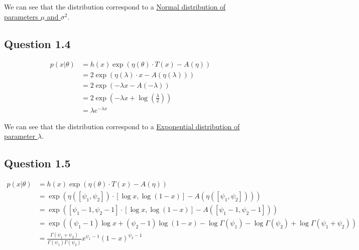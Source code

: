 \documentclass{article}
\begin{document}
We can see that the distribution correspond to a \underline{Normal distribution of parameters $\mu$ and $\sigma^2$}.

\subsection*{Question 1.4}

\begin{equation}
    \begin{split}
        p(x|\theta) & = h(x) \exp(\eta(\theta) \cdot T(x) - A(\eta))                        \\
                    & = 2 \exp(\eta(\lambda) \cdot x - A(\eta(\lambda)))                    \\
                    & = 2 \exp(- \lambda x - A(-\lambda))                                   \\
                    & = 2 \exp\left(- \lambda x + \log\left(\frac{\lambda}{2}\right)\right) \\
                    & = \lambda e^{- \lambda x}
    \end{split}
\end{equation}

We can see that the distribution correspond to a \underline{Exponential distribution of parameter $\lambda$}.

\subsection*{Question 1.5}

\begin{equation}
    \begin{split}
        p(x|\theta) & = h(x) \exp(\eta(\theta) \cdot T(x) - A(\eta))                                                                                     \\
                    & = \exp(\eta([\psi_1, \psi_2]) \cdot [\log x, \log (1 - x)] - A(\eta([\psi_1, \psi_2])))                                            \\
                    & = \exp([\psi_1 - 1, \psi_2 - 1] \cdot [\log x, \log (1 - x)] - A([\psi_1 - 1, \psi_2 - 1]))                                        \\
                    & = \exp((\psi_1 - 1) \log x + (\psi_2 - 1) \log (1 - x) - \log \Gamma(\psi_1) - \log \Gamma(\psi_2) + \log \Gamma(\psi_1 + \psi_2)) \\
                    & = \frac{\Gamma(\psi_1 + \psi_2)}{\Gamma(\psi_1) \Gamma(\psi_2)} x^{\psi_1 - 1} (1 - x)^{\psi_2 - 1}
    \end{split}
\end{equation}
\end{document}
